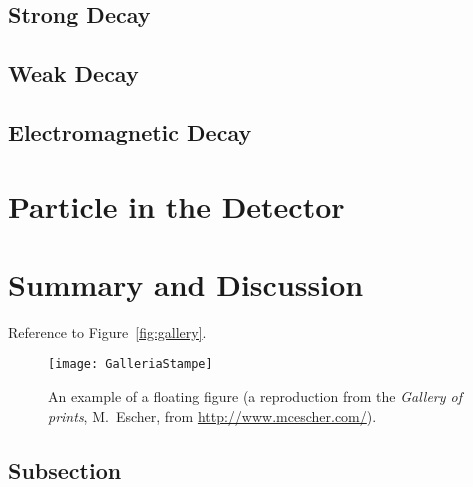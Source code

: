 \documentclass[
10pt, %
a4paper, %
oneside, %
headinclude,footinclude, %
BCOR5mm, %
]{scrartcl}
\begin{document}
\subsection{Strong Decay}

\subsection{Weak Decay}

\subsection{Electromagnetic Decay}


\section{Particle in the Detector}



\section{Summary and Discussion}

Reference to Figure~\vref{fig:gallery}. %

\begin{figure}[tb]
\centering 
\texttt{[image: GalleriaStampe]} 
\caption[An example of a floating figure]{An example of a floating figure (a reproduction from the \emph{Gallery of prints}, M.~Escher, from \url{http://www.mcescher.com/}).} %
\label{fig:gallery} 
\end{figure}

\lipsum[10] %


\subsection{Subsection}
\end{document}
